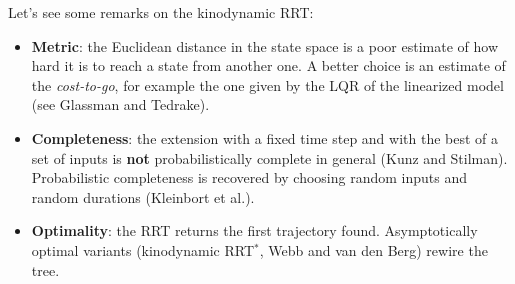 \documentclass[10pt, a4paper]{report}
\begin{document}
Let's see some remarks on the kinodynamic RRT:
\begin{itemize}
    \item \textbf{Metric}: the Euclidean distance in the state space is a poor estimate of how hard it is to reach a state from another one. A better choice is an estimate of the \textit{cost-to-go}, for example the one given by the LQR of the linearized model (see Glassman and Tedrake).
    \item \textbf{Completeness}: the extension with a fixed time step and with the best of a set of inputs is \textbf{not} probabilistically complete in general (Kunz and Stilman). Probabilistic completeness is recovered by choosing random inputs and random durations (Kleinbort et al.).
    \item \textbf{Optimality}: the RRT returns the first trajectory found. Asymptotically optimal variants (kinodynamic RRT$^*$, Webb and van den Berg) rewire the tree.
\end{itemize}
\end{document}
